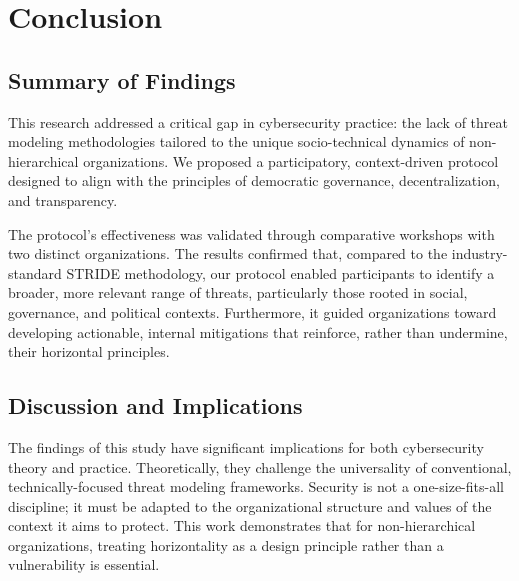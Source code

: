 
%

\chapter{Conclusion}
\label{cha:conclusion}

\glsresetall

\section{Summary of Findings}
\label{sec:summary-of-findings}

This research addressed a critical gap in cybersecurity practice: the lack of
threat modeling methodologies tailored to the unique socio-technical dynamics of
non-hierarchical organizations. We proposed a participatory, context-driven
protocol designed to align with the principles of democratic governance,
decentralization, and transparency.

The protocol's effectiveness was validated through comparative workshops with
two distinct organizations. The results confirmed that, compared to the
industry-standard STRIDE methodology, our protocol enabled participants to
identify a broader, more relevant range of threats, particularly those rooted in
social, governance, and political contexts. Furthermore, it guided organizations
toward developing actionable, internal mitigations that reinforce, rather than
undermine, their horizontal principles.

\section{Discussion and Implications}
\label{sec:discussion-and-implications}

The findings of this study have significant implications for both cybersecurity
theory and practice. Theoretically, they challenge the universality of
conventional, technically-focused threat modeling frameworks. Security is not a
one-size-fits-all discipline; it must be adapted to the organizational structure
and values of the context it aims to protect. This work demonstrates that for
non-hierarchical organizations, treating horizontality as a design principle
rather than a vulnerability is essential.

